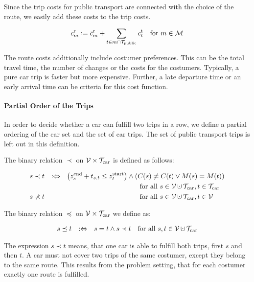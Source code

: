 Since the trip costs for public transport are connected with the choice of the route, we easily add these costs to the trip costs.

\begin{align*}
	c^{\operatorname{r}}_m := \bar{c}^{\operatorname{r}}_m + \sum_{t\in m\cap\mathcal{T}_{\operatorname{public}}}c^{\operatorname{t}}_t && \text{for } m\in\mathcal{M}
\end{align*}

The route costs additionally include costumer preferences. This can be the total travel time, the number of changes or the costs for the costumers. Typically, a pure car trip is faster but more expensive. Further, a late departure time or an early arrival time can be criteria for this cost function.

\paragraph{Partial Order of the Trips} \parfill

In order to decide whether a car can fulfill two trips in a row, we define a partial ordering of the car set and the set of car trips. The set of public transport trips is left out in this definition.

\begin{definition}
\label{def:partial_order}

The binary relation $\prec$ on $\mathcal{V}\times\mathcal{T}_{\operatorname{car}}$ is defined as follows:

\begin{align*}
	s\prec t && :\Leftrightarrow && \left(\zend_s + t_{s,t} \leq \zstart_t\right)\land\left(	C(s)\neq C(t)\lor M(s)=M(t)\right) \\
	&&&& \text{for all } s\in\mathcal{V}\cupdot\Tcar, t\in\Tcar \hphantom{\mathcal{V}} \\
	s\not\prec t &&&& \text{for all } s\in\mathcal{V}\cupdot\Tcar, t\in\mathcal{V} \hphantom{\Tcar}
\end{align*}

The binary relation $\preceq$ on $\mathcal{V}\times\mathcal{T}_{\operatorname{car}}$ we define as:

\begin{align*}
	s\preceq t && :\Leftrightarrow && s=t \land s\prec t && \text{for all } s,t\in\mathcal{V}\cupdot\Tcar
\end{align*}

\end{definition}

The expression $s\prec t$ means, that one car is able to fulfill both trips, first $s$ and then $t$. A car must not cover two trips of the same costumer, except they belong to the same route. This results from the problem setting, that for each costumer exactly one route is fulfilled. 

